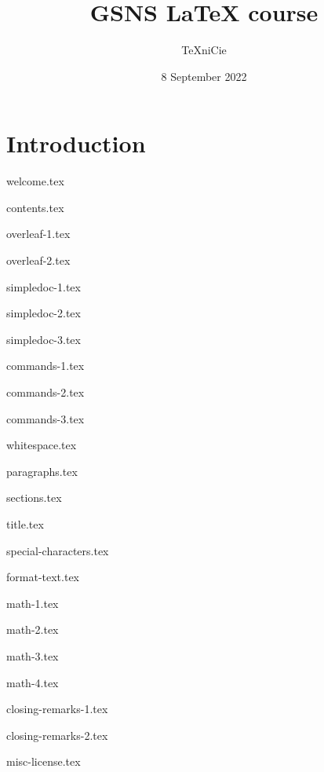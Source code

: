 \documentclass[allauthors]{../../cursuspresentatie}
\title{GSNS \LaTeX{} course}
\author{\TeX niCie}
\date{8 September 2022}
\def\importslide#1#2{%
	{#2}
}
\begin{document}
\section{Introduction}
\importslide{beginners}{welcome.tex}
\importslide{beginners}{contents.tex}

\importslide{beginners}{overleaf-1.tex}
\importslide{beginners}{overleaf-2.tex}


\importslide{beginners}{simpledoc-1.tex}
\importslide{beginners}{simpledoc-2.tex}
\importslide{beginners}{simpledoc-3.tex}


\importslide{beginners}{commands-1.tex}
\importslide{beginners}{commands-2.tex}
\importslide{beginners}{commands-3.tex}

\importslide{beginners}{whitespace.tex}

\importslide{beginners}{paragraphs.tex}



\importslide{beginners}{sections.tex}
\importslide{beginners}{title.tex}


\importslide{beginners}{special-characters.tex}

\importslide{beginners}{format-text.tex}


\importslide{beginners}{math-1.tex}

\importslide{beginners}{math-2.tex}


\importslide{beginners}{math-3.tex}

\importslide{beginners}{math-4.tex}


\importslide{beginners}{closing-remarks-1.tex}
\importslide{beginners}{closing-remarks-2.tex}

	
\importslide{misc}{misc-license.tex}
\end{document}
